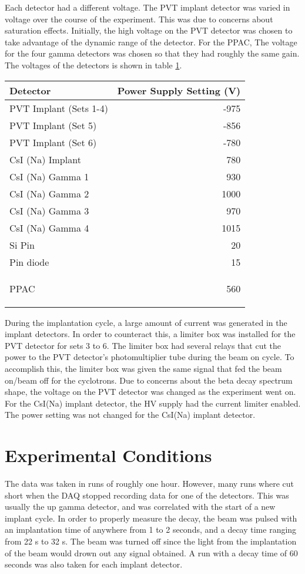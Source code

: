 \documentclass[main.tex]{subfiles}
\begin{document}
Each detector had a different voltage. 
The PVT implant detector was varied in voltage over the course of the experiment.
This was due to concerns about saturation effects.
Initially, the high voltage on the PVT detector was chosen to take advantage of the dynamic range of the detector.
For the PPAC, 
The voltage for the four gamma detectors was chosen so that they had roughly the same gain.
The voltages of the detectors is shown in table \ref{tab:detvolt}.
\begin{table}[!hbt]
	\centering
		\begin{tabular}{l|r}
		Detector & Power Supply Setting (V) \\ \hline
		PVT Implant (Sets 1-4) & -975 \\
		PVT Implant (Set 5) & -856 \\
		PVT Implant (Set 6) & -780 \\
		CsI (Na) Implant & 780 \\ 
		CsI (Na) Gamma 1 & 930 \\
		CsI (Na) Gamma 2 & 1000 \\
		CsI (Na) Gamma 3 & 970 \\
		CsI (Na) Gamma 4 & 1015 \\
		Si Pin & 20 \\
		Pin diode & 15 \\
		PPAC & 560  
		
		\label{tab:detvolt}
		\end{tabular}
\end{table}

During the implantation cycle, a large amount of current was generated in the implant detectors.
In order to counteract this, a limiter box was installed for the PVT detector for sets 3 to 6.
The limiter box had several relays that cut the power to the PVT detector's photomultiplier tube during the beam on cycle. 
To accomplish this, the limiter box was given the same signal that fed the beam on/beam off for the cyclotrons.
Due to concerns about the beta decay spectrum shape, the voltage on the PVT detector was changed as the experiment went on. 
For the CsI(Na) implant detector, the HV supply had the current limiter enabled.
The power setting was not changed for the CsI(Na) implant detector. 


\section{Experimental Conditions}
The data was taken in runs of roughly one hour. 
However, many runs where cut short when the DAQ stopped recording data for one of the detectors.
This was usually the up gamma detector, and was correlated with the start of a new implant cycle.
In order to properly measure the decay, the beam was pulsed with an implantation time of anywhere from 1 to 2 seconds, and a decay time ranging from 22 s to 32 s. 
The beam was turned off since the light from the implantation of the beam would drown out any signal obtained. 
A run with a decay time of 60 seconds was also taken for each implant detector. 
\end{document}
